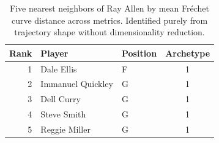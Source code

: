 \begin{table}[htbp]
  \centering\small
  \begin{tabular}{rllc}
    \toprule
    Rank & Player & Position & Archetype \\
    \midrule
    1 & Dale Ellis & F & 1 \\
    2 & Immanuel Quickley & G & 1 \\
    3 & Dell Curry & G & 1 \\
    4 & Steve Smith & G & 1 \\
    5 & Reggie Miller & G & 1 \\
    \bottomrule
  \end{tabular}
  \caption{Five nearest neighbors of Ray Allen by mean Fr\'{e}chet curve distance across metrics. Identified purely from trajectory shape without dimensionality reduction.}
  \label{tab:Ray_Allen_frechet_curve_neighbors}
\end{table}


